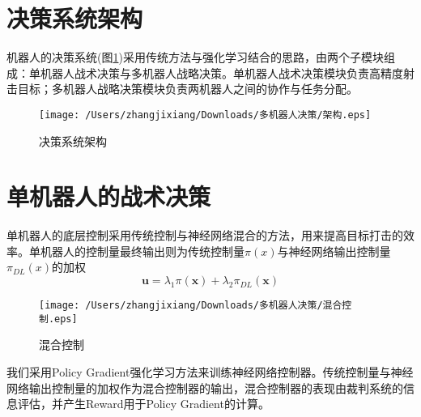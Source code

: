 \documentclass[12pt]{ctexart}
\begin{document}
%
%


\newpage
\section{决策系统架构}
机器人的决策系统(图\ref{fig:decision})采用传统方法与强化学习结合的思路，由两个子模块组成：单机器人战术决策与多机器人战略决策。单机器人战术决策模块负责高精度射击目标；多机器人战略决策模块负责两机器人之间的协作与任务分配。



\begin{figure}[tbph!]
	\centering
	\texttt{[image: /Users/zhangjixiang/Downloads/多机器人决策/架构.eps]}
	\caption{决策系统架构}
	\label{fig:decision}
\end{figure}

\section{单机器人的战术决策}
单机器人的底层控制采用传统控制与神经网络混合的方法，用来提高目标打击的效率。单机器人的控制量最终输出则为传统控制量$\pi(x)$与神经网络输出控制量$\pi_{DL}(x)$的加权
\begin{equation}
\mathbf{u} = \lambda_{1}\pi(\mathbf{x})+ \lambda_{2}\pi_{DL}(\mathbf{x})
\end{equation}

\begin{figure}[tbph!]
	\centering
	\texttt{[image: /Users/zhangjixiang/Downloads/多机器人决策/混合控制.eps]}
	\caption{混合控制}
	\label{fig:hybrid}
\end{figure}

我们采用Policy Gradient强化学习方法来训练神经网络控制器。传统控制量与神经网络输出控制量的加权作为混合控制器的输出，混合控制器的表现由裁判系统的信息评估，并产生Reward用于Policy Gradient的计算。
\end{document}
